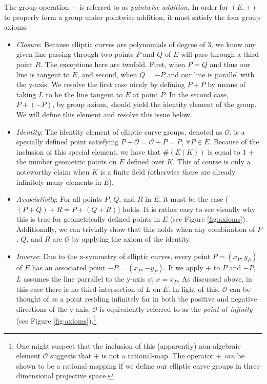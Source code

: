 The group operation $+$ is referred to as \emph{pointwise addition}. In order for $(E,+)$ to properly form a group under pointwise addition, it must satisfy the four group axioms:
\begin{itemize}
\item \emph{Closure}: Because elliptic curves are polynomials of degree of 3, we know any given line passing through two points $P$ and $Q$ of $E$ will pass through a third point $R$. The exceptions here are twofold. First, when $P = Q$ and thus our line is tangent to $E$, and second, when $Q = -P$ and our line is parallel with the y-axis. We resolve the first case nicely by defining $P + P$ by means of taking $L$ to be the line tangent to $E$ at point $P$. In the second case, $P + (-P)$, by group axiom, should yield the identity element of the group. We will define this element and resolve this issue below.  
\item \emph{Identity}: The identity element of elliptic curve groups, denoted as $\mathcal{O}$, is a specially defined point satisfying $P + \mathcal{O} = \mathcal{O} + P = P$, $\forall P \in E$. Because of the inclusion of this special element, we have that $\#(E(K))$ is equal to $1$ $+$ the number geometric points on $E$ defined over $K$. This of course is only a noteworthy claim when $K$ is a finite field (otherwise there are already infinitely many elements in $E$).
\item \emph{Associativity}: For all points $P$, $Q$, and $R$ in $E$, it must be the case ($(P + Q) + R = P + (Q + R)$) holds. It is rather easy to see visually why this is true for geometrically defined points in $E$ (see Figure \ref{fig:axioms}). Additionally, we can trivially show that this holds when any combination of $P$, $Q$, and $R$ are $\mathcal{O}$ by applying the axiom of the identity.
\item \emph{Inverse}: Due to the x-symmetry of elliptic curves, every point $P = (x_P, y_P)$ of $E$ has an associated point $-P = (x_P, -y_P)$. If we apply $+$ to $P$ and $-P$, $L$ assumes the line parrallel to the y-axis at $x = x_P$. As discussed above, in this case there is no third intersection of $L$ on $E$. In light of this, $\mathcal{O}$ can be thought of as a point residing infinitely far in both the positive and negative directions of the y-axis. $\mathcal{O}$ is equivalently referred to as the \emph{point at infinity} (see Figure \ref{fig:axioms}).\footnote{One might suspect that the inclusion of this (apparently) non-algebraic element $\mathcal{O}$ suggests that $+$ is not a rational-map. The operator $+$ \emph{can} be shown to be a rational-mapping if we define our elliptic curve groups in three-dimensional projective space.}
\end{itemize}

